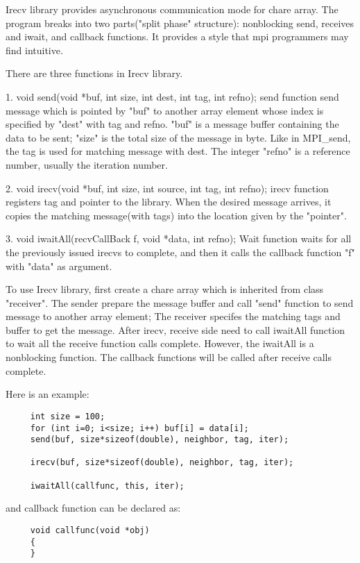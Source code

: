 {\sc Irecv} library provides asynchronous communication mode for chare array. The program breaks into two parts("split phase" structure): nonblocking send, receives and iwait, and callback functions. It provides a style that mpi programmers may find intuitive. 

There are three functions in Irecv library.

1. void send(void *buf, int size, int dest, int tag, int refno);
send function send message which is pointed by "buf" to another array element whose index is specified by "dest" with tag and refno.
"buf" is a message buffer containing the data to be sent; "size" is the total size of the message in byte. 
Like in MPI\_send, the tag is used for matching message with dest. The integer "refno" is a reference number, usually the iteration number.
  

2. void irecv(void *buf, int size, int source, int tag, int refno);
irecv function registers tag and pointer to the library. When the desired message arrives, it copies the matching message(with tags) into the location given by the "pointer".

3. void iwaitAll(recvCallBack f, void *data, int refno);
Wait function waits for all the previously issued irecvs to complete, and then it calls the callback function "f" with "data" as argument.

To use Irecv library, first create a chare array which is inherited from class "receiver". The sender prepare the message buffer and call "send" function to send message to another array element; The receiver specifes the matching tags and buffer to get the message. After irecv, receive side need to call iwaitAll function to wait all the receive function calls complete. However, the iwaitAll is a nonblocking function. The callback functions will be called after receive calls complete.

Here is an example:

\begin{verbatim}
     int size = 100;
     for (int i=0; i<size; i++) buf[i] = data[i];
     send(buf, size*sizeof(double), neighbor, tag, iter);

     irecv(buf, size*sizeof(double), neighbor, tag, iter);

     iwaitAll(callfunc, this, iter);
\end{verbatim}

and callback function can be declared as:

\begin{verbatim}
     void callfunc(void *obj)
     {
     }
\end{verbatim}
